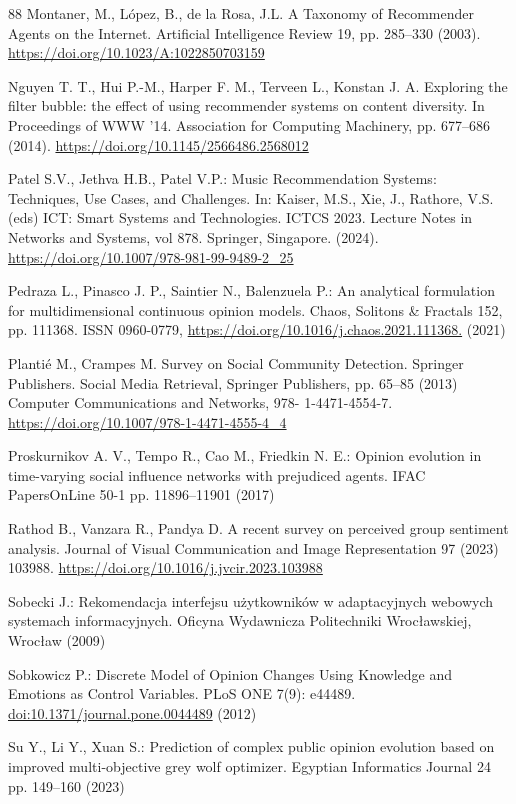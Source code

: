 \begin{thebibliography}{88}
Montaner, M., López, B., de la Rosa, J.L. A Taxonomy of Recommender Agents on the Internet. Artificial Intelligence Review 19, pp. 285--330 (2003). \url{https://doi.org/10.1023/A:1022850703159}

Nguyen T. T., Hui P.-M., Harper F. M., Terveen L., Konstan J. A. Exploring the filter bubble: the effect of using recommender systems on content diversity. In Proceedings of WWW '14. Association for Computing Machinery, pp. 677--686 (2014). \url{https://doi.org/10.1145/2566486.2568012}

Patel S.V., Jethva H.B., Patel V.P.: Music Recommendation Systems: Techniques, Use Cases, and Challenges. In: Kaiser, M.S., Xie, J., Rathore, V.S. (eds) ICT: Smart Systems and Technologies. ICTCS 2023. Lecture Notes in Networks and Systems, vol 878. Springer, Singapore. (2024). \url{https://doi.org/10.1007/978-981-99-9489-2_25}

 Pedraza L., Pinasco J. P., Saintier N., Balenzuela P.: An analytical formulation for multidimensional continuous opinion models. Chaos, Solitons \& Fractals 152, pp. 111368. ISSN 0960-0779, \url{https://doi.org/10.1016/j.chaos.2021.111368.} (2021)

Plantié M., Crampes M. Survey on Social Community Detection. Springer Publishers. Social Media Retrieval, Springer Publishers, pp. 65--85 (2013) Computer Communications and Networks, 978-
1-4471-4554-7. \url{https://doi.org/10.1007/978-1-4471-4555-4_4}

 Proskurnikov A. V., Tempo R., Cao M., Friedkin N. E.: Opinion evolution in time-varying social influence networks with prejudiced agents. IFAC PapersOnLine 50-1 pp. 11896--11901 (2017)

Rathod B., Vanzara R., Pandya D. A recent survey on perceived group sentiment analysis. Journal of Visual Communication and Image Representation 97 (2023) 103988. \url{https://doi.org/10.1016/j.jvcir.2023.103988}

Sobecki J.: Rekomendacja interfejsu użytkowników w adaptacyjnych webowych systemach informacyjnych. Oficyna Wydawnicza Politechniki Wrocławskiej, Wrocław (2009)

 Sobkowicz P.: Discrete Model of Opinion Changes Using Knowledge and Emotions as Control Variables. PLoS ONE 7(9): e44489. \url{doi:10.1371/journal.pone.0044489} (2012)

 Su Y., Li Y., Xuan S.: Prediction of complex public opinion evolution based on improved multi-objective grey wolf optimizer. Egyptian Informatics Journal 24 pp. 149--160 (2023)


\end{thebibliography}
